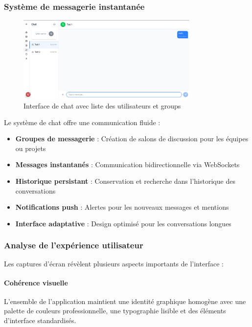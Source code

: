 \documentclass[12pt]{rapportPfe}
\begin{document}
\subsubsection{Système de messagerie instantanée}

\begin{figure}[H]
    \centering
    \includegraphics[width=0.8\textwidth]{diagrams/a_ss_06.png}
    \caption{Interface de chat avec liste des utilisateurs et groups}
    \label{fig:chat}
\end{figure}

Le système de chat offre une communication fluide :
\begin{itemize}
    \item \textbf{Groupes de messagerie} : Création de salons de discussion pour les équipes ou projets
    \item \textbf{Messages instantanés} : Communication bidirectionnelle via WebSockets
    \item \textbf{Historique persistant} : Conservation et recherche dans l'historique des conversations
    \item \textbf{Notifications push} : Alertes pour les nouveaux messages et mentions
    \item \textbf{Interface adaptative} : Design optimisé pour les conversations longues
\end{itemize}

\subsubsection{Analyse de l'expérience utilisateur}

Les captures d'écran révèlent plusieurs aspects importants de l'interface :

\paragraph{Cohérence visuelle}
L'ensemble de l'application maintient une identité graphique homogène avec une palette de couleurs professionnelle, une typographie lisible et des éléments d'interface standardisés.
\end{document}
